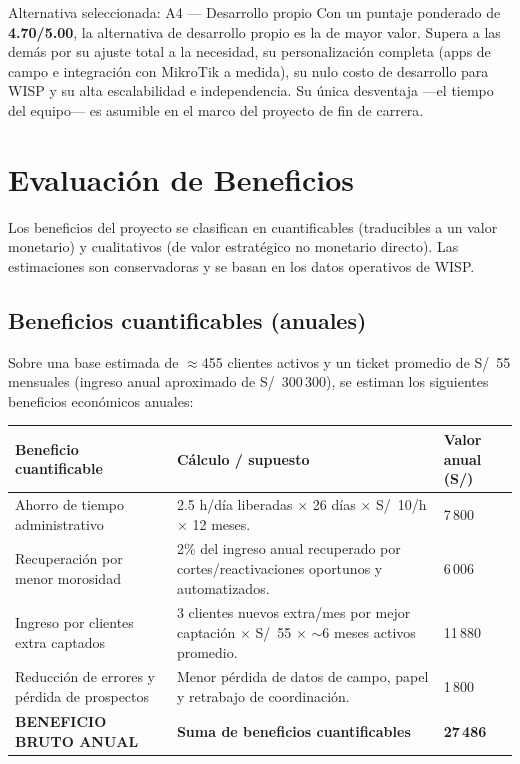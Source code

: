 \begin{upeubox}{Alternativa seleccionada: A4 — Desarrollo propio}
Con un puntaje ponderado de \textbf{4.70/5.00}, la alternativa de desarrollo propio
es la de mayor valor. Supera a las demás por su ajuste total a la necesidad, su
personalización completa (apps de campo e integración con MikroTik a medida), su
nulo costo de desarrollo para WISP y su alta escalabilidad e independencia. Su única
desventaja ---el tiempo del equipo--- es asumible en el marco del proyecto de fin de
carrera.
\end{upeubox}

\section{Evaluación de Beneficios}
\label{sec:beneficios}

Los beneficios del proyecto se clasifican en cuantificables (traducibles a un valor
monetario) y cualitativos (de valor estratégico no monetario directo). Las
estimaciones son conservadoras y se basan en los datos operativos de WISP.

\subsection{Beneficios cuantificables (anuales)}

Sobre una base estimada de $\approx$455 clientes activos y un ticket promedio de
S/~55 mensuales (ingreso anual aproximado de S/~300\,300), se estiman los siguientes
beneficios económicos anuales:

\begin{center}
\label{tab:beneficios-cuant}
\begin{tabularx}{\textwidth}{L{4cm} X R{2cm}}
\toprule
\textbf{Beneficio cuantificable} & \textbf{Cálculo / supuesto} & \textbf{Valor anual (S/)} \\
\midrule
Ahorro de tiempo administrativo &
2.5 h/día liberadas $\times$ 26 días $\times$ S/~10/h $\times$ 12 meses. & 7\,800 \\
Recuperación por menor morosidad &
2\% del ingreso anual recuperado por cortes/reactivaciones oportunos y automatizados. & 6\,006 \\
Ingreso por clientes extra captados &
3 clientes nuevos extra/mes por mejor captación $\times$ S/~55 $\times$ $\sim$6 meses
activos promedio. & 11\,880 \\
Reducción de errores y pérdida de prospectos &
Menor pérdida de datos de campo, papel y retrabajo de coordinación. & 1\,800 \\
\midrule
\textbf{BENEFICIO BRUTO ANUAL} & \textbf{Suma de beneficios cuantificables} & \textbf{27\,486} \\
\bottomrule
\end{tabularx}
\end{center}

